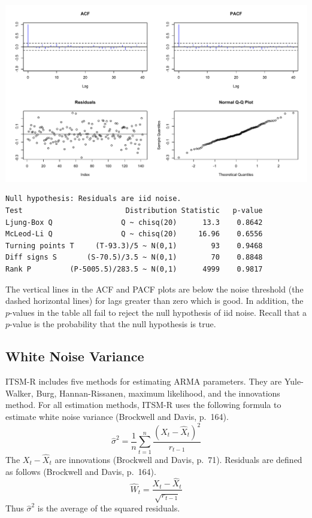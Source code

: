 \documentclass[12pt]{article}
\begin{document}
\begin{center}
\includegraphics[scale=0.3]{Rplot-6.pdf}
\end{center}

\begin{verbatim}
Null hypothesis: Residuals are iid noise.
Test                        Distribution Statistic   p-value
Ljung-Box Q                Q ~ chisq(20)      13.3    0.8642
McLeod-Li Q                Q ~ chisq(20)     16.96    0.6556
Turning points T     (T-93.3)/5 ~ N(0,1)        93    0.9468
Diff signs S       (S-70.5)/3.5 ~ N(0,1)        70    0.8848
Rank P         (P-5005.5)/283.5 ~ N(0,1)      4999    0.9817
\end{verbatim}

The vertical lines in the ACF and PACF plots are below the noise threshold
(the dashed horizontal lines)
for lags greater than zero which is good.
In addition, the $p$-values in the table all fail to reject the null hypothesis
of iid noise.
Recall that a $p$-value is the probability that the null hypothesis is true.

\subsection{White Noise Variance}

ITSM-R includes five methods for estimating ARMA parameters.
They are Yule-Walker, Burg, Hannan-Rissanen, maximum likelihood,
and the innovations method.
For all estimation methods, ITSM-R uses
the following formula to estimate white noise variance
(Brockwell and Davis, p.~164).
\[
\hat\sigma^2=\frac{1}{n}\sum_{t=1}^n\frac{(X_t-\hat X_t)^2}{r_{t-1}}
\]
The $X_t-\hat X_t$ are innovations (Brockwell and Davis, p.~71).
Residuals are defined as follows (Brockwell and Davis, p.~164).
\[
\hat W_t=\frac{X_t-\hat X_t}{\sqrt{r_{t-1}}}
\]
Thus $\hat\sigma^2$ is the average of the squared residuals.
\end{document}
